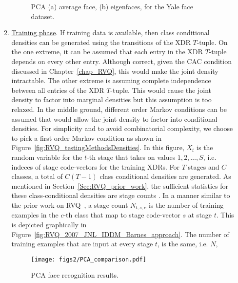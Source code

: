 \begin{Body}
\begin{enumerate}
\begin{enumerate}
											\begin{figure}[t]
											\centering
											\caption{PCA (a) average face, (b) eigenfaces, for the Yale face dataset.}
											\label{fig:PCA_eigenfaces_Yale}
											\end{figure}

\item \underline{Training phase}.  If training data is available, then class conditional densities can be generated using the transitions of the XDR $T$-tuple.  On the one extreme, it can be assumed that each entry in the XDR $T$-tuple depends on every other entry.  Although correct, given the CAC condition discussed in Chapter~\ref{chap_RVQ}, this would make the joint density intractable.  The other extreme is assuming complete independence between all entries of the XDR $T$-tuple.  This would cause the joint density to factor into marginal densities but this assumption is too relaxed.  In the middle ground, different order Markov conditions can be assumed that would allow the joint density to factor into conditional densities.  For simplicity and to avoid combinatorial complexity, we choose to pick a first order Markov condition as shown in Figure~\ref{fig:RVQ_testingMethodsDensities}.  In this figure, $X_t$ is the random variable for the $t$-th stage that takes on values $1, 2, \ldots, S$, i.e. indeces of stage code-vectors for the training XDRs.  For $T$ stages and $C$ classes, a total of $C(T-1)$ class conditional densities are generated.  As mentioned in Section~\ref{Sec:RVQ_prior_work}, the sufficient statistics for these class-conditional densities are stage counts \cite{1993_BOOK_SSP_Kay}.  In a manner similar to the prior work on RVQ~\cite{2007_JNL_Katrina_Barnes, 2007_JNL_IDDM_Barnes}, a stage count $N_{t,s,c}$ is the number of training examples in the $c$-th class that map to stage code-vector $s$ at stage $t$.  This is depicted graphically in Figure~\ref{fig:RVQ_2007_JNL_IDDM_Barnes_approach}.  The number of training examples that are input at every stage $t$,  is the same, i.e. $N$,

											\begin{figure}[t]
											\center
											\texttt{[image: figs2/PCA\_comparison.pdf]}
											\caption{PCA face recognition results.}
											\label{fig:PCA_yaleface_results}
											\end{figure}



\end{enumerate}
\end{enumerate}
\end{Body}
